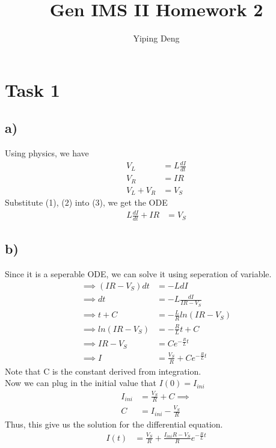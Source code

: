 \documentclass{article}
\newcommand{\hwnumber}{2}
\begin{document}
\title{Gen IMS II Homework \hwnumber}
\author{Yiping Deng}
\maketitle
\thispagestyle{fancy}
\section*{Task 1}
\subsection*{a)}
Using physics, we have
\begin{align}
    V_{L} &= L \frac{dI}{dt} \\
    V_{R} &= IR \\
    V_{L} + V_{R} &= V_{S}
\end{align}
Substitute (1), (2) into (3), we get the ODE
\begin{align}
    L \frac{dI}{dt} + IR &= V_{S}
\end{align}
\subsection*{b)}
Since it is a seperable ODE, we can solve it using seperation
of variable.
\begin{align}
    \implies (IR - V_{S})dt &= -L dI \\
    \implies dt &= -L \frac{dI}{IR - V_{S}} \\
    \implies t + C &= -\frac{L}{R} ln(IR - V_{S}) \\
    \implies ln(IR-V_{S}) &= -\frac{R}{L} t + C \\
    \implies IR - V_{S} &= C e^{-\frac{R}{L} t} \\
    \implies I &= \frac{V_{S}}{R} + C e^{-\frac{R}{L} t}
\end{align}
Note that C is the constant derived from integration. \\
Now we can plug in the initial value that $I(0) = I_{ini}$
\begin{align}
    I_{ini} &= \frac{V_{S}}{R} + C \implies \\
    C &= I_{ini} - \frac{V_{S}}{R}
\end{align}
Thus, this give us the solution for the differential equation.
\begin{align}
    I(t) &= \frac{V_{S}}{R} + \frac{I_{ini} R - V_{S}}{R} e^{-\frac{R}{L} t}
\end{align}
\end{document}
